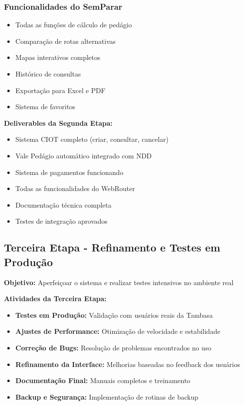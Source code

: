 \documentclass[12pt,a4paper]{article}
\begin{document}
\subsubsection{Funcionalidades do SemParar}
\begin{itemize}
    \item Todas as funções de cálculo de pedágio
    \item Comparação de rotas alternativas
    \item Mapas interativos completos
    \item Histórico de consultas
    \item Exportação para Excel e PDF
    \item Sistema de favoritos
\end{itemize}

\textbf{Deliverables da Segunda Etapa:}
\begin{itemize}
    \item Sistema CIOT completo (criar, consultar, cancelar)
    \item Vale Pedágio automático integrado com NDD
    \item Sistema de pagamentos funcionando
    \item Todas as funcionalidades do WebRouter
    \item Documentação técnica completa
    \item Testes de integração aprovados
\end{itemize}

\subsection{Terceira Etapa - Refinamento e Testes em Produção}
\textbf{Objetivo:} Aperfeiçoar o sistema e realizar testes intensivos no ambiente real


\textbf{Atividades da Terceira Etapa:}
\begin{itemize}
    \item \textbf{Testes em Produção:} Validação com usuários reais da Tambasa
    \item \textbf{Ajustes de Performance:} Otimização de velocidade e estabilidade
    \item \textbf{Correção de Bugs:} Resolução de problemas encontrados no uso
    \item \textbf{Refinamento da Interface:} Melhorias baseadas no feedback dos usuários
    \item \textbf{Documentação Final:} Manuais completos e treinamento
    \item \textbf{Backup e Segurança:} Implementação de rotinas de backup
\end{itemize}
\end{document}
